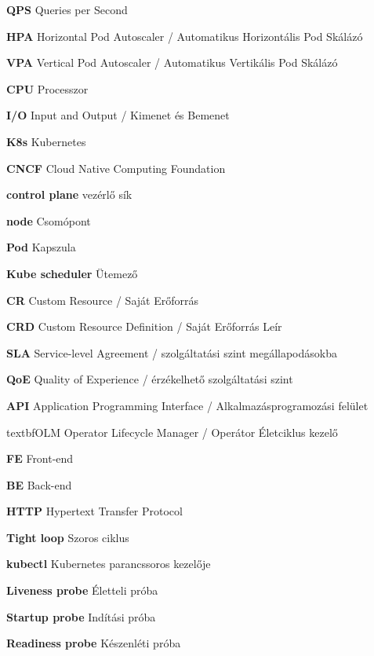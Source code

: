 \begin{multicols}{2}
\textbf{QPS} Queries per Second 

\textbf{HPA} Horizontal Pod Autoscaler / Automatikus Horizontális Pod Skálázó 

\textbf{VPA} Vertical Pod Autoscaler / Automatikus Vertikális Pod Skálázó 

\textbf{CPU} Processzor 

\textbf{I/O} Input and Output / Kimenet és Bemenet 

\textbf{K8s} Kubernetes 

\textbf{CNCF} Cloud Native Computing Foundation 

\textbf{control plane} vezérlő sík 

\textbf{node} Csomópont 

\textbf{Pod} Kapszula 

\textbf{Kube scheduler} Ütemező 

\textbf{CR} Custom Resource / Saját Erőforrás 

\textbf{CRD} Custom Resource Definition / Saját Erőforrás Leír

\textbf{SLA} Service-level Agreement / szolgáltatási szint megállapodásokba

\textbf{QoE} Quality of Experience / érzékelhető szolgáltatási szint

\columnbreak

\textbf{API} Application Programming Interface / Alkalmazásprogramozási felület 

textbf{OLM} Operator Lifecycle Manager / Operátor Életciklus kezelő 

\textbf{FE} Front-end 

\textbf{BE} Back-end 

\textbf{HTTP} Hypertext Transfer Protocol 

\textbf{Tight loop} Szoros ciklus 

\textbf{kubectl} Kubernetes parancssoros kezelője 

\textbf{Liveness probe} Életteli próba 

\textbf{Startup probe} Indítási próba 

\textbf{Readiness probe} Készenléti próba 

\end{multicols}

